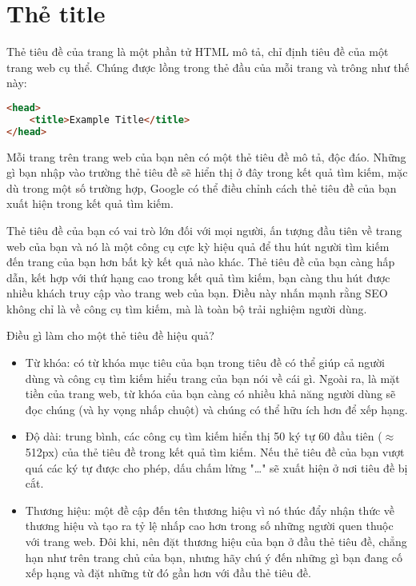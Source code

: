\section{Thẻ title}
Thẻ tiêu đề của trang là một phần tử HTML mô tả, chỉ định tiêu đề của một trang web cụ thể. Chúng được lồng trong thẻ đầu của mỗi trang và trông như thế này:
\begin{lstlisting}[language=html]
<head>
	<title>Example Title</title>
</head>
\end{lstlisting}
\par
Mỗi trang trên trang web của bạn nên có một thẻ tiêu đề mô tả, độc đáo. Những gì bạn nhập vào trường thẻ tiêu đề sẽ hiển thị ở đây trong kết quả tìm kiếm, mặc dù trong một số trường hợp, Google có thể điều chỉnh cách thẻ tiêu đề của bạn xuất hiện trong kết quả tìm kiếm.
\par
Thẻ tiêu đề của bạn có vai trò lớn đối với mọi người, ấn tượng đầu tiên về trang web của bạn và nó là một công cụ cực kỳ hiệu quả để thu hút người tìm kiếm đến trang của bạn hơn bất kỳ kết quả nào khác. Thẻ tiêu đề của bạn càng hấp dẫn, kết hợp với thứ hạng cao trong kết quả tìm kiếm, bạn càng thu hút được nhiều khách truy cập vào trang web của bạn. Điều này nhấn mạnh rằng SEO không chỉ là về công cụ tìm kiếm, mà là toàn bộ trải nghiệm người dùng.
\par
Điều gì làm cho một thẻ tiêu đề hiệu quả?
\begin{itemize}
	\item Từ khóa: có từ khóa mục tiêu của bạn trong tiêu đề có thể giúp cả người dùng và công cụ tìm kiếm hiểu trang của bạn nói về cái gì. Ngoài ra, là mặt tiền của trang web, từ khóa của bạn càng có nhiều khả năng người dùng sẽ đọc chúng (và hy vọng nhấp chuột) và chúng có thể hữu ích hơn để xếp hạng.
	\item Độ dài: trung bình, các công cụ tìm kiếm hiển thị 50 ký tự 60 đầu tiên ($\approx$ 512px) của thẻ tiêu đề trong kết quả tìm kiếm. Nếu thẻ tiêu đề của bạn vượt quá các ký tự được cho phép, dấu chấm lửng "\ldots" sẽ xuất hiện ở nơi tiêu đề bị cắt.
	\item Thương hiệu: một đề cập đến tên thương hiệu vì nó thúc đẩy nhận thức về thương hiệu và tạo ra tỷ lệ nhấp cao hơn trong số những người quen thuộc với trang web. Đôi khi, nên đặt thương hiệu của bạn ở đầu thẻ tiêu đề, chẳng hạn như trên trang chủ của bạn, nhưng hãy chú ý đến những gì bạn đang cố xếp hạng và đặt những từ đó gần hơn với đầu thẻ tiêu đề.
\end{itemize}
